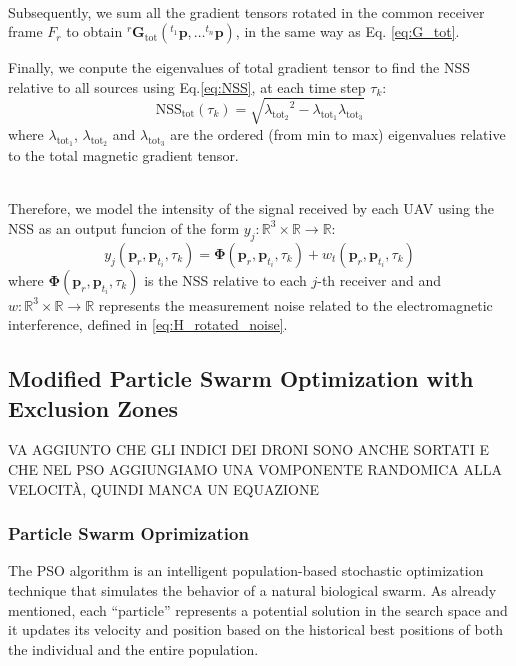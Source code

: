 \noindent
\\
Subsequently, we sum all the gradient tensors rotated in the common receiver frame $F_{r}$
to obtain ${}^{r} \mathbf{G}_{\text{tot}} ({}^{t_1} \mathbf{p}, \dots {}^{t_n} \mathbf{p})$, in the same way as Eq. \ref{eq:G_tot}.

Finally, we conpute the eigenvalues of total gradient 
tensor to find the NSS relative to all sources using Eq.\ref{eq:NSS},
 at each time step \( \tau_k \):
\begin{equation}
    \text{NSS}_\text{tot}(\tau_k) = \sqrt{{\lambda_{\text{tot}_2}}^2 - \lambda_{\text{tot}_1} \lambda_{\text{tot}_3}}
    \label{eq:NSS_multi_final}
\end{equation}
where $\lambda_{\text{tot}_1}$, $\lambda_{\text{tot}_2}$ and $\lambda_{\text{tot}_3}$
are the ordered (from min to max) eigenvalues relative to the total magnetic gradient tensor.

\noindent
\\
Therefore, we model the intensity of the signal received by each UAV using the NSS
as an output funcion of the form \( y_j : \mathbb{R}^3 
\times \mathbb{R} \rightarrow \mathbb{R} \):
\begin{equation}
y_j(\mathbf{p}_{r}, \mathbf{p}_{t_i}, \tau_k) = \mathbf{\Phi}(\mathbf{p}_{r}, \mathbf{p}_{t_i}, \tau_k) + 
w_t(\mathbf{p}_{r}, \mathbf{p}_{t_i}, \tau_k)
\label{eq:received_signal}
\end{equation}
where $\mathbf{\Phi}(\mathbf{p}_{r}, \mathbf{p}_{t_i}, \tau_k)$ is the NSS
relative to each $j$-th receiver and 
and \( w : \mathbb{R}^3 \times \mathbb{R} \rightarrow \mathbb{R} \) 
represents the measurement noise related to the electromagnetic interference,
defined in \ref{eq:H_rotated_noise}.

\subsection{Modified Particle Swarm Optimization with Exclusion Zones}
VA AGGIUNTO CHE GLI INDICI DEI DRONI SONO ANCHE SORTATI E CHE NEL PSO AGGIUNGIAMO
UNA VOMPONENTE RANDOMICA ALLA VELOCITÀ, QUINDI MANCA UN EQUAZIONE
\subsubsection{Particle Swarm Oprimization}
\label{sec:PSO}
The PSO algorithm is an intelligent population-based stochastic optimization technique 
that simulates the behavior of a natural biological swarm. 
As already mentioned, each “particle” represents a potential solution in the search space
and it updates its velocity and position based on the historical best positions 
of both the individual and the entire population.
 
